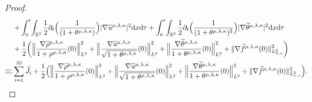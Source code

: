 \documentclass[reqno,11pt]{amsart}
\theoremstyle{plain}
\numberwithin{equation}{section}
\begin{document}
\begin{proof}
\begin{align}
&+ \int_0^t\!\int_{\mathbb{R}^3} \frac{1}{2}  \partial_t \Big(\frac{1}{(1+\theta^{\mu,\lambda,\kappa}) } \Big) |\nabla\widetilde u^{\mu,\lambda,\kappa}|^2 {\rm d}x{\rm d}\tau+ \int_0^t\!\int_{\mathbb{R}^3} \frac{1}{2}  \partial_t \Big(\frac{1}{(1+\theta^{\mu,\lambda,\kappa})^2 } \Big) |\nabla\widetilde \theta^{\mu,\lambda,\kappa}|^2 {\rm d}x{\rm d}\tau\nonumber\\ 
&+\frac{1}{2}   \bigg(\Big\|\frac{ \nabla\widetilde\rho^{\mu,\lambda,\kappa}}{1+\rho^{\mu,\lambda,\kappa}}(0)\Big\|_{L^2}^2+\Big\|\frac{\nabla \widetilde u^{\mu,\lambda,\kappa}}{\sqrt{1+\theta^{\mu,\lambda,\kappa}}}(0)\Big\|_{L^2}^{2}+\Big\|\frac{\nabla\widetilde\theta^{\mu,\lambda,\kappa}}{1+\theta^{\mu,\lambda,\kappa}}(0)\Big\|_{L^2}^2 +\|\nabla \widetilde f^{\mu,\lambda,\kappa}(0)\|_{L_{x,v}^{2}}^2\bigg)\nonumber\\
\equiv:&\sum_{i=1}^{32}\widetilde{J}_i+\frac{1}{2}   \Big(\Big\|\frac{ \nabla\widetilde\rho^{\mu,\lambda,\kappa}}{1+\rho^{\mu,\lambda,\kappa}}(0)\Big\|_{L^2}^2+\Big\|\frac{\nabla \widetilde u^{\mu,\lambda,\kappa}}{\sqrt{1+\theta^{\mu,\lambda,\kappa}}}(0)\Big\|_{L^2}^{2}+\Big\|\frac{\nabla\widetilde\theta^{\mu,\lambda,\kappa}}{1+\theta^{\mu,\lambda,\kappa}}(0)\Big\|_{L^2}^2 +\|\nabla \widetilde f^{\mu,\lambda,\kappa}(0)\|_{L_{x,v}^{2}}^2\Big) .
\end{align} 


\end{proof}
\end{document}
